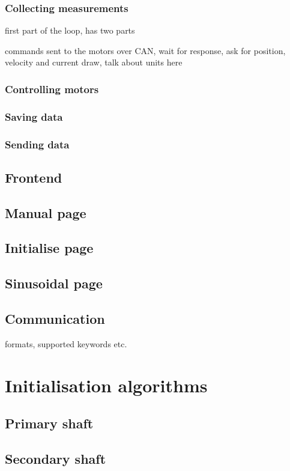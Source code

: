 \documentclass[12pt]{article}
\begin{document}
\subsubsection{Collecting measurements}
first part of the loop, has two parts

commands sent to the motors over CAN, wait for response, ask for position, velocity and current draw, talk about units here



\subsubsection{Controlling motors}
\subsubsection{Saving data}
\subsubsection{Sending data}


\subsection{Frontend}
\subsection{Manual page}
\subsection{Initialise page}
\subsection{Sinusoidal page}

\subsection{Communication}
formats, supported keywords etc.


\section{Initialisation algorithms}
\subsection{Primary shaft}
\subsection{Secondary shaft}
\end{document}
